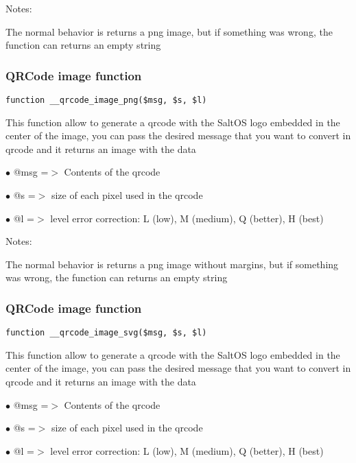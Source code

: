 \documentclass[a4paper]{article}
\begin{document}
Notes:

The normal behavior is returns a png image, but if something was wrong,
the function can returns an empty string

\hypertarget{toc521}{}
\subsubsection{QRCode image function}

\begin{lstlisting}
function __qrcode_image_png($msg, $s, $l)
\end{lstlisting}

This function allow to generate a qrcode with the SaltOS logo embedded
in the center of the image, you can pass the desired message that you
want to convert in qrcode and it returns an image with the data

\begin{compactitem}
\item[\color{myblue}$\bullet$] @msg =$>$ Contents of the qrcode
\item[\color{myblue}$\bullet$] @s   =$>$ size of each pixel used in the qrcode
\item[\color{myblue}$\bullet$] @l   =$>$ level error correction: L (low), M (medium), Q (better), H (best)
\end{compactitem}

Notes:

The normal behavior is returns a png image without margins, but if something
was wrong, the function can returns an empty string

\hypertarget{toc522}{}
\subsubsection{QRCode image function}

\begin{lstlisting}
function __qrcode_image_svg($msg, $s, $l)
\end{lstlisting}

This function allow to generate a qrcode with the SaltOS logo embedded
in the center of the image, you can pass the desired message that you
want to convert in qrcode and it returns an image with the data

\begin{compactitem}
\item[\color{myblue}$\bullet$] @msg =$>$ Contents of the qrcode
\item[\color{myblue}$\bullet$] @s   =$>$ size of each pixel used in the qrcode
\item[\color{myblue}$\bullet$] @l   =$>$ level error correction: L (low), M (medium), Q (better), H (best)
\end{compactitem}
\end{document}
